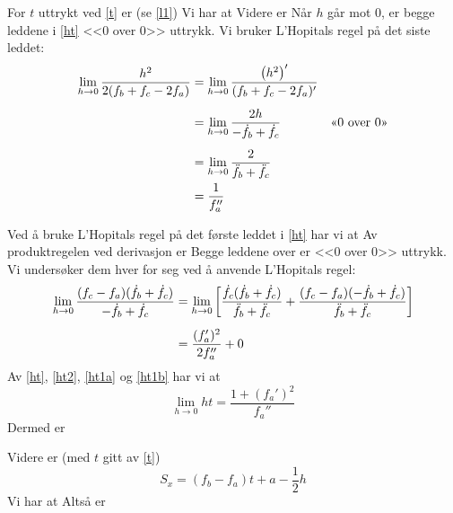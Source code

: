 For $ t $ uttrykt ved \eqref{t} er (se \eqref{l1})
Vi har at
Videre er
Når $ h $ går mot 0, er begge leddene i \eqref{ht} <<0 over 0>> uttrykk. Vi bruker L'Hopitals regel på det siste leddet: 
\begin{align}
	&&\lim\limits_{h\to0}\frac{h^2}{2(f_b+f_c-2f_a)}&=\lim\limits_{h\to0}\frac{\left(h^2\right)'}{(f_b+f_c-2f_a)'} \br
	&&&=\lim\limits_{h\to0} \frac{2h}{-\dot{f}_b+\dot{f}_c} &&\text{<<0 over 0>>}\br
	&&&=\lim\limits_{h\to0} \frac{2}{\ddot{f}_b+\ddot{f}_c}  \\
	&& &=\frac{1}{f_a''} \label{ht2}
\end{align}

Ved å bruke L'Hopitals regel på det første leddet i \eqref{ht} har vi at
Av produktregelen ved derivasjon er
Begge leddene over er <<0 over 0>> uttrykk. Vi undersøker dem hver for seg ved å anvende L'Hopitals regel:
\begin{align}
	\lim\limits_{h\to 0}\frac{(f_c-f_a)(\dot{f}_b+\dot{f}_c)}{-\dot{f}_b+\dot{f}_c}&= \lim\limits_{h\to 0}\left[\frac{\dot{f}_c(\dot{f}_b+\dot{f}_c)}{\ddot{f}_b+\ddot{f}_c}+\frac{(f_c-f_a)(-\dot{f}_b+\dot{f}_c)}{\ddot{f}_b+\ddot{f}_c}\right]\br
	&=\frac{(f_a')^2}{2f_a''}+0 \label{ht1b}
\end{align}
Av \eqref{ht}, \eqref{ht2}, \eqref{ht1a} og \eqref{ht1b} har vi at
\[ \lim\limits_{h\to0} h t=\frac{1+(f_a')^2}{f_a''} \]
Dermed er 

Videre er (med $ t $ gitt av \eqref{t})
\[ S_x=(f_b-f_a)t+a-\frac{1}{2}h \]
Vi har at
Altså er
